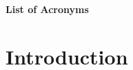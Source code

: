 \documentclass[11pt]{report}
\begin{document}
%
%



%
%



%
%

\tableofcontents

%
%

\newpage
\Large{\textbf{List of Acronyms}}
\small


%
%

\chapter{Introduction}
\label{intro}


%
%


% 
% 

% 
% 
% 

%
%





% 

%
%

% 
% 

%
%

% 
% 
% 
% 
% 
\end{document}
